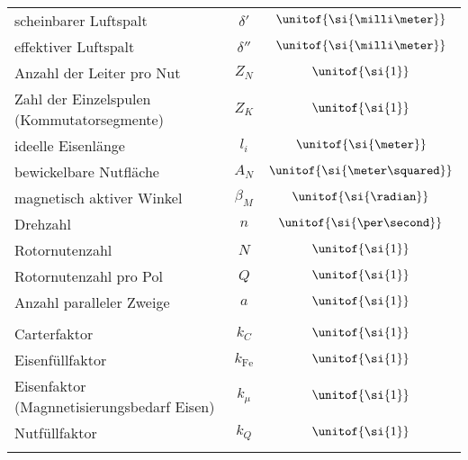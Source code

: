 {{\begin{tabular*}{\columnwidth}{p{4.2cm}cc}
scheinbarer Luftspalt & $\delta'$ & $\unitof{\si{\milli\meter}}$\\
effektiver Luftspalt & $\delta''$ & $\unitof{\si{\milli\meter}}$\\
Anzahl der Leiter pro Nut & $Z_N$ & $\unitof{\si{1}}$\\
Zahl der Einzelspulen (Kommutatorsegmente) & $Z_K$ & $\unitof{\si{1}}$\\
ideelle Eisenlänge & $l_i$ & $\unitof{\si{\meter}}$\\
bewickelbare Nutfläche & $A_N$ & $\unitof{\si{\meter\squared}}$\\
magnetisch aktiver Winkel & $\beta_M$ & $\unitof{\si{\radian}}$\\
Drehzahl & $n$ & $\unitof{\si{\per\second}}$\\
Rotornutenzahl & $N$ & $\unitof{\si{1}}$\\
Rotornutenzahl pro Pol & $Q$ & $\unitof{\si{1}}$\\
Anzahl paralleler Zweige & $a$ & $\unitof{\si{1}}$\\
\cmrule
\multicolumn{3}{c}{\textbf{Näherungsfaktoren}}\\
\cmrule
Carterfaktor & $k_C$ & $\unitof{\si{1}}$\\
Eisenfüllfaktor & $k_\text{Fe}$ & $\unitof{\si{1}}$\\
Eisenfaktor (Magnnetisierungsbedarf Eisen) & $k_\mu$ & $\unitof{\si{1}}$\\
Nutfüllfaktor & $k_Q$ & $\unitof{\si{1}}$\\
\cbrule
\end{tabular*}
}
}
